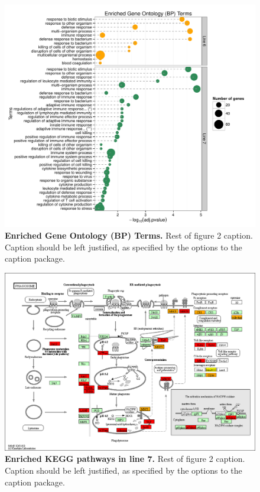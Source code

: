 \documentclass[10pt]{article}
\begin{document}
\begin{figure}[!ht]
\begin{center}
\includegraphics[width=7in]{line67_GOseq_GO_cleveland.pdf}
\end{center}
\caption{
{\bf Enriched Gene Ontology (BP) Terms.} Rest of figure 2  caption.  Caption 
should be left justified, as specified by the options to the caption 
package.
}
\label{line67_go}
\end{figure}

\begin{figure}[!ht]
\begin{center}
\includegraphics[width=6in]{line67_KEGG_gga04145.png}
\end{center}
\caption{
{\bf Enriched KEGG pathways in line 7.}  Rest of figure 2  caption.  Caption 
should be left justified, as specified by the options to the caption 
package.
}
\label{KEGG_phagosome}
\end{figure}
\end{document}
